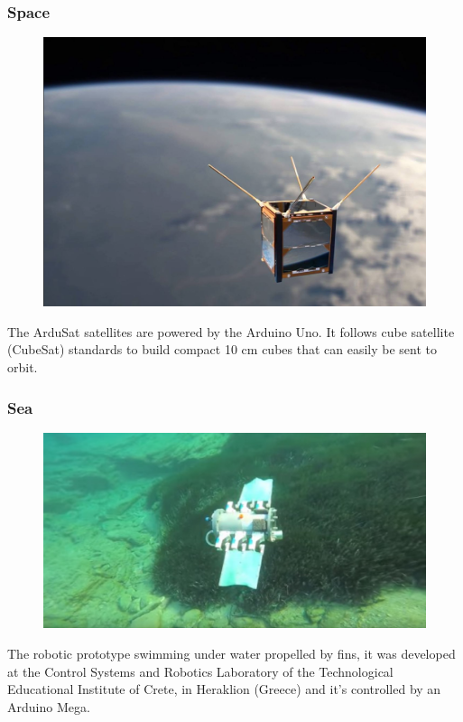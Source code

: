 \begin{frame}
	\frametitle{Space}
	\begin{figure}
		\includegraphics[scale=.3]{assets/sat}  
	\end{figure}
	The ArduSat satellites are powered by the Arduino Uno. It follows cube satellite (CubeSat) standards to build compact 10 cm cubes that can easily be sent to orbit. 
\end{frame}

\begin{frame}
	\frametitle{Sea}
	\begin{figure}
		\includegraphics[scale=.4]{assets/sea}  
	\end{figure}
	The robotic prototype swimming under water propelled by fins, it was developed at the Control Systems and Robotics Laboratory of the Technological Educational Institute of Crete, in Heraklion (Greece) and it's controlled by an Arduino Mega.
\end{frame}


